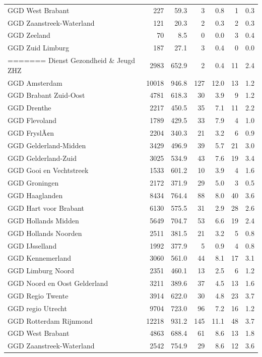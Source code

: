 \documentclass[
  english,
  man,floatsintext]{apa6}
\begin{document}
\begin{table}[H]
\begin{threeparttable}
\begin{tabular}{lrrrrrr}
GGD West Brabant & 227 & 59.3 & 3 & 0.8 & 1 & 0.3\\
GGD Zaanstreek-Waterland & 121 & 20.3 & 2 & 0.3 & 2 & 0.3\\
GGD Zeeland & 70 & 8.5 & 0 & 0.0 & 3 & 0.4\\
GGD Zuid Limburg & 187 & 27.1 & 3 & 0.4 & 0 & 0.0\\
=======
Dienst Gezondheid \& Jeugd ZHZ & 2983 & 652.9 & 2 & 0.4 & 11 & 2.4\\
GGD Amsterdam & 10018 & 946.8 & 127 & 12.0 & 13 & 1.2\\
GGD Brabant Zuid-Oost & 4781 & 618.3 & 30 & 3.9 & 9 & 1.2\\
GGD Drenthe & 2217 & 450.5 & 35 & 7.1 & 11 & 2.2\\
GGD Flevoland & 1789 & 429.5 & 33 & 7.9 & 4 & 1.0\\
GGD FryslÃ¢n & 2204 & 340.3 & 21 & 3.2 & 6 & 0.9\\
GGD Gelderland-Midden & 3429 & 496.9 & 39 & 5.7 & 21 & 3.0\\
GGD Gelderland-Zuid & 3025 & 534.9 & 43 & 7.6 & 19 & 3.4\\
GGD Gooi en Vechtstreek & 1533 & 601.2 & 10 & 3.9 & 4 & 1.6\\
GGD Groningen & 2172 & 371.9 & 29 & 5.0 & 3 & 0.5\\
GGD Haaglanden & 8434 & 764.4 & 88 & 8.0 & 40 & 3.6\\
GGD Hart voor Brabant & 6130 & 575.5 & 31 & 2.9 & 28 & 2.6\\
GGD Hollands Midden & 5649 & 704.7 & 53 & 6.6 & 19 & 2.4\\
GGD Hollands Noorden & 2511 & 381.5 & 21 & 3.2 & 5 & 0.8\\
GGD IJsselland & 1992 & 377.9 & 5 & 0.9 & 4 & 0.8\\
GGD Kennemerland & 3060 & 561.0 & 44 & 8.1 & 17 & 3.1\\
GGD Limburg Noord & 2351 & 460.1 & 13 & 2.5 & 6 & 1.2\\
GGD Noord en Oost Gelderland & 3211 & 389.6 & 37 & 4.5 & 13 & 1.6\\
GGD Regio Twente & 3914 & 622.0 & 30 & 4.8 & 23 & 3.7\\
GGD regio Utrecht & 9704 & 723.0 & 96 & 7.2 & 16 & 1.2\\
GGD Rotterdam Rijnmond & 12218 & 931.2 & 145 & 11.1 & 48 & 3.7\\
GGD West Brabant & 4863 & 688.4 & 61 & 8.6 & 13 & 1.8\\
GGD Zaanstreek-Waterland & 2542 & 754.9 & 29 & 8.6 & 12 & 3.6\\

\end{tabular}
\end{threeparttable}
\end{table}
\end{document}
